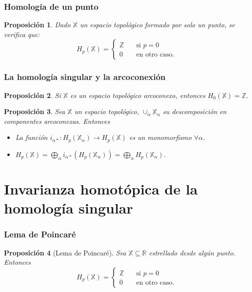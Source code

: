 \documentclass{beamer}
\def\X{{\mathbb X}}
\def\Z{{\mathbb Z}}
\def\R{{\mathbb R}}
\theoremstyle{theorem}
\newtheorem{myproposition}{Proposición}
\begin{document}
\begin{frame}
  \frametitle{Homología de un punto}
  \begin{myproposition}
    Dado $\X$ un espacio topológico formado por solo un punto, se verifica que:
    \[H_p(\X) = \begin{cases} \Z &\quad \text{si } p = 0 \\
                              0  &\quad \text{en otro caso.} \end{cases} \]
  \end{myproposition}

\end{frame}


\begin{frame}
  \frametitle{La homología singular y la arcoconexión}
  \begin{myproposition}
    Si $\X$ es un espacio topológico arcoconexo, entonces $H_0(\X) = \Z$.
  \end{myproposition}

  \begin{myproposition}
    Sea $\X$ un espacio topológico, $\cup_\alpha \X_\alpha$ su descomposición en componentes arcoconexas. Entonces
    \begin{itemize}
      \item[a)] La función $i_{\alpha *} \colon H_p(\X_\alpha) \to H_p(\X)$ es un monomorfismo $\forall \alpha$.
      \item[b)] $H_p(\X) = \bigoplus_\alpha i_{\alpha *}(H_p(\X_\alpha)) = \bigoplus_\alpha H_p(\X_\alpha)$.
    \end{itemize}
  \end{myproposition}
\end{frame}


\section{Invarianza homotópica de la homología singular}

\begin{frame}
  \frametitle{Lema de Poincaré}
  \begin{myproposition}[Lema de Poincaré]
    Sea $\X \subseteq \R$ estrellado desde algún punto. Entonces
    \[ H_p(\X) = \begin{cases} \Z &\quad \text{si } p = 0 \\
                              0  &\quad \text{en otro caso.} \end{cases} \]
  \end{myproposition}

\end{frame}
\end{document}
